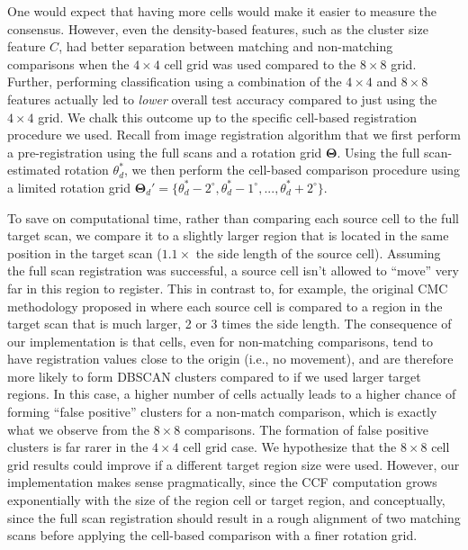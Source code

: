 \documentclass[11pt,]{isuthesis}
\begin{document}
One would expect that having more cells would make it easier to measure the consensus.
However, even the density-based features, such as the cluster size feature \(C\), had better separation between matching and non-matching comparisons when the \(4 \times 4\) cell grid was used compared to the \(8 \times 8\) grid.
Further, performing classification using a combination of the \(4 \times 4\) and \(8 \times 8\) features actually led to \emph{lower} overall test accuracy compared to just using the \(4 \times 4\) grid.
We chalk this outcome up to the specific cell-based registration procedure we used.
Recall from image registration algorithm that we first perform a pre-registration using the full scans and a rotation grid \(\pmb{\Theta}\).
Using the full scan-estimated rotation \(\theta_d^*\), we then perform the cell-based comparison procedure using a limited rotation grid \(\pmb{\Theta}_d' = \{\theta_d^* - 2^\circ, \theta_d^* - 1^\circ,...,\theta_d^* + 2^\circ\}\).

To save on computational time, rather than comparing each source cell to the full target scan, we compare it to a slightly larger region that is located in the same position in the target scan (\(1.1 \times\) the side length of the source cell).
Assuming the full scan registration was successful, a source cell isn't allowed to ``move'' very far in this region to register.
This in contrast to, for example, the original CMC methodology proposed in \citet{song_proposed_2013} where each source cell is compared to a region in the target scan that is much larger, 2 or 3 times the side length.
The consequence of our implementation is that cells, even for non-matching comparisons, tend to have registration values close to the origin (i.e., no movement), and are therefore more likely to form DBSCAN clusters compared to if we used larger target regions.
In this case, a higher number of cells actually leads to a higher chance of forming ``false positive'' clusters for a non-match comparison, which is exactly what we observe from the \(8 \times 8\) comparisons.
The formation of false positive clusters is far rarer in the \(4 \times 4\) cell grid case.
We hypothesize that the \(8 \times 8\) cell grid results could improve if a different target region size were used.
However, our implementation makes sense pragmatically, since the CCF computation grows exponentially with the size of the region cell or target region, and conceptually, since the full scan registration should result in a rough alignment of two matching scans before applying the cell-based comparison with a finer rotation grid.
\end{document}
